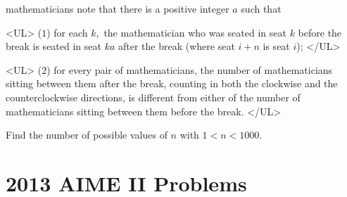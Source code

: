 \documentclass{article}
\begin{document}
\begin{enumerate}[label=\arabic*., itemsep=0.5em]
mathematicians note that there is a positive integer \(a\) such that

<UL>
(\(1\)) for each \(k,\) the mathematician who was seated in seat \(k\) before the break is seated in seat \(ka\) after the break (where seat \(i + n\) is seat \(i\));
</UL>

<UL>
(\(2\)) for every pair of mathematicians, the number of mathematicians sitting between them after the break, counting in both the clockwise and the counterclockwise directions, is different from either of the number of mathematicians sitting between them before the break.
</UL>

Find the number of possible values of \(n\) with \(1 < n < 1000.\)\par \vspace{0.5em}\end{enumerate}\newpage\section*{2013 AIME II Problems}
\end{document}
